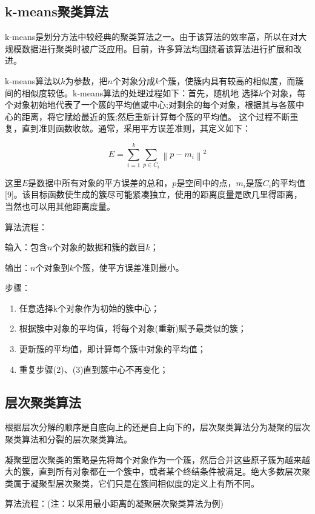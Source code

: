 \subsection{k-means聚类算法}

k-means是划分方法中较经典的聚类算法之一。由于该算法的效率高，所以在对大规模数据进行聚类时被广泛应用。目前，许多算法均围绕着该算法进行扩展和改进。

k-means算法以$k$为参数，把$n$个对象分成$k$个簇，使簇内具有较高的相似度，而簇间的相似度较低。k-means算法的处理过程如下：首先，随机地 选择$k$个对象，每个对象初始地代表了一个簇的平均值或中心;对剩余的每个对象，根据其与各簇中心的距离，将它赋给最近的簇;然后重新计算每个簇的平均值。 这个过程不断重复，直到准则函数收敛。通常，采用平方误差准则，其定义如下：

$$
E=\sum_{i=1}^{k}\sum_{p\in C_i}\left\|p-m_i\right\|^2
$$

这里$E$是数据中所有对象的平方误差的总和，$p$是空间中的点，$m_i$是簇$C_i$的平均值[9]。该目标函数使生成的簇尽可能紧凑独立，使用的距离度量是欧几里得距离，当然也可以用其他距离度量。

算法流程：

输入：包含$n$个对象的数据和簇的数目$k$；

输出：$n$个对象到$k$个簇，使平方误差准则最小。

步骤：

\begin{enumerate}\itemsep0em
		\item 任意选择k个对象作为初始的簇中心；
		\item 根据簇中对象的平均值，将每个对象(重新)赋予最类似的簇；
		\item 更新簇的平均值，即计算每个簇中对象的平均值；
		\item 重复步骤(2)、(3)直到簇中心不再变化；
\end{enumerate}

\subsection{层次聚类算法}


根据层次分解的顺序是自底向上的还是自上向下的，层次聚类算法分为凝聚的层次聚类算法和分裂的层次聚类算法。

凝聚型层次聚类的策略是先将每个对象作为一个簇，然后合并这些原子簇为越来越大的簇，直到所有对象都在一个簇中，或者某个终结条件被满足。绝大多数层次聚类属于凝聚型层次聚类，它们只是在簇间相似度的定义上有所不同。


算法流程：(注：以采用最小距离的凝聚层次聚类算法为例)

